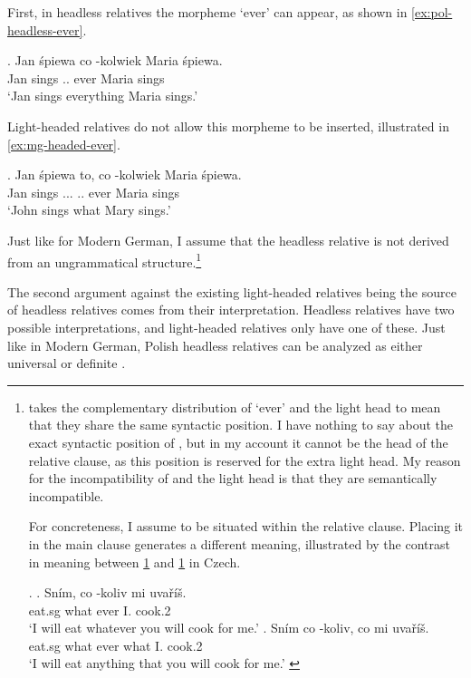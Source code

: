 First, in headless relatives the morpheme  `ever' can appear, as shown in \ref{ex:pol-headless-ever}.

\exg. Jan śpiewa co -kolwiek Maria śpiewa.\\
Jan sings .. ever Maria sings\\
`Jan sings everything Maria sings.' \label{ex:pol-headless-ever}

Light-headed relatives do not allow this morpheme to be inserted, illustrated in \ref{ex:mg-headed-ever}.

\exg. Jan śpiewa to, co -kolwiek Maria śpiewa.\\
Jan sings ... .. ever Maria sings\\
`John sings what Mary sings.' \label{ex:pol-headed-ever}

Just like for Modern German, I assume that the headless relative is not derived from an ungrammatical structure.\footnote{
\citet{citko2004} takes the complementary distribution of  `ever' and the light head to mean that they share the same syntactic position. I have nothing to say about the exact syntactic position of , but in my account it cannot be the head of the relative clause, as this position is reserved for the extra light head. My reason for the incompatibility of  and the light head is that they are semantically incompatible.

For concreteness, I assume  to be situated within the relative clause. Placing it in the main clause generates a different meaning, illustrated by the contrast in meaning between \ref{ex:cz-wh-ever} and \ref{ex:cz-ever-wh} in Czech.

\ex.
\ag. Sním, co -koliv mi uvaříš.\\
 eat.sg what ever I. cook.2\\
 `I will eat whatever you will cook for me.'\label{ex:cz-wh-ever}
\bg. Sním co -koliv, co mi uvaříš.\\
 eat.sg what ever what I. cook.2\\
 `I will eat anything that you will cook for me.' \label{ex:cz-ever-wh}

\phantom{x}
}

The second argument against the existing light-headed relatives being the source of headless relatives comes from their interpretation. Headless relatives have two possible interpretations, and light-headed relatives only have one of these.
Just like in Modern German, Polish headless relatives can be analyzed as either universal or definite .

